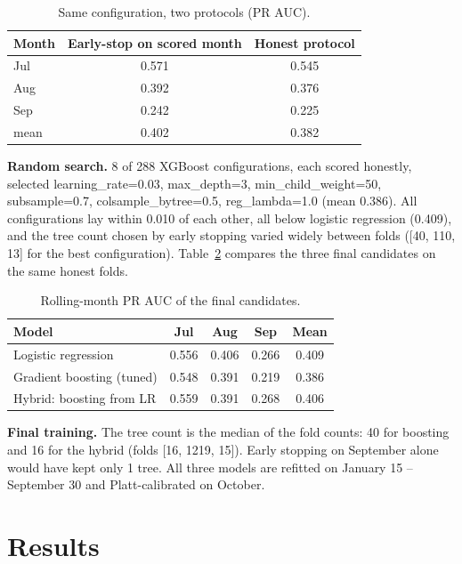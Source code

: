 \documentclass[conference]{IEEEtran}
\begin{document}
\begin{table}[t]\centering\caption{Same configuration, two protocols (PR AUC).}\label{tab:trap}
\footnotesize\begin{tabular}{lcc}\toprule
Month & Early-stop on scored month & Honest protocol\\\midrule
Jul & 0.571 & 0.545\\
Aug & 0.392 & 0.376\\
Sep & 0.242 & 0.225\\
mean & 0.402 & 0.382\\
\bottomrule\end{tabular}\end{table}

\textbf{Random search.} 8 of 288 XGBoost configurations, each scored honestly, selected learning\_rate=0.03, max\_depth=3, min\_child\_weight=50, subsample=0.7, colsample\_bytree=0.5, reg\_lambda=1.0 (mean 0.386). All configurations lay within 0.010 of each other, all below logistic regression (0.409), and the tree count chosen by early stopping varied widely between folds ([40, 110, 13] for the best configuration). Table~\ref{tab:roll} compares the three final candidates on the same honest folds.

\begin{table}[t]\centering\caption{Rolling-month PR AUC of the final candidates.}\label{tab:roll}
\footnotesize\begin{tabular}{lcccc}\toprule
Model & Jul & Aug & Sep & Mean\\\midrule
Logistic regression & 0.556 & 0.406 & 0.266 & 0.409\\
Gradient boosting (tuned) & 0.548 & 0.391 & 0.219 & 0.386\\
Hybrid: boosting from LR & 0.559 & 0.391 & 0.268 & 0.406\\
\bottomrule\end{tabular}\end{table}

\textbf{Final training.} The tree count is the median of the fold counts: 40 for boosting and 16 for the hybrid (folds [16, 1219, 15]). Early stopping on September alone would have kept only 1 tree. All three models are refitted on January 15 -- September 30 and Platt-calibrated on October.

\section{Results}
\end{document}

